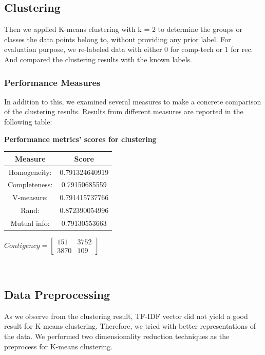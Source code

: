 \documentclass{article}
\begin{document}
\subsection{Clustering}
Then we applied K-means clustering with k = 2 to determine the groups or classes the data points belong to, without providing any prior label. For evaluation purpose, we re-labeled data with either 0 for comp-tech or 1 for rec. And compared the clustering results with the known labels. 


\subsubsection{Performance Measures}
In addition to this, we examined several measures to make a concrete comparison of the clustering results. Results from different measures are reported in the following table: 

\begin{center}
	\textbf{Performance metrics' scores for clustering}	\\ \vspace{10pt}
	\begin{tabular}{*{2}{c}}
		\toprule
		\textbf{Measure} & \textbf{Score}  \\
		\midrule
		Homogeneity: & 0.791324640919  \\
		\midrule
		Completeness: & 0.79150685559   \\
		\midrule
		V-measure: & 0.791415737766   \\
		\midrule
		Rand: & 0.872390054996   \\
		\midrule
		Mutual info: & 0.79130553663  \\
		\bottomrule
	\end{tabular}
	\qquad
	$Contigency = \left[\begin{array}{*{2}{c}}
    				151 & 3752 \\
     				3870 & 109
					\end{array}\right]
					$
\end{center}    

\\ \vspace{20pt}

\subsection{Data Preprocessing}
As we observe from the clustering result, TF\--IDF vector did not yield a good result for K-means clustering. Therefore, we tried with better representations of the data. We performed two dimensionality reduction techniques as the preprocess for K-means clustering.
\end{document}
